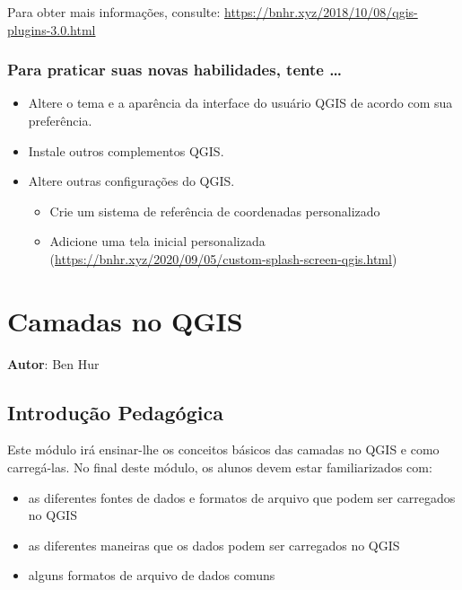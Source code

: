 \documentclass[
  portuguese,
]{krantz}
\providecommand{\tightlist}{%
  \setlength{\itemsep}{0pt}\setlength{\parskip}{0pt}}
\begin{document}
Para obter mais informações, consulte: \href{https://bnhr.xyz/2018/10/08/qgis-plugins-3.0.\%20html}{https://bnhr.xyz/2018/10/08/qgis-plugins-3.0.html}

\hypertarget{para-praticar-suas-novas-habilidades-tente}{%
\subsection{Para praticar suas novas habilidades, tente \ldots{}}\label{para-praticar-suas-novas-habilidades-tente}}

\begin{itemize}
\tightlist
\item
  Altere o tema e a aparência da interface do usuário QGIS de acordo com sua preferência.
\item
  Instale outros complementos QGIS.
\item
  Altere outras configurações do QGIS.

  \begin{itemize}
  \tightlist
  \item
    Crie um sistema de referência de coordenadas personalizado
  \item
    Adicione uma tela inicial personalizada (\href{https://bnhr.xyz/2020/09/05/custom-splash\%20-screen-qgis.html}{https://bnhr.xyz/2020/09/05/custom-splash-screen-qgis.html})
  \end{itemize}
\end{itemize}

\hypertarget{camadas-no-qgis}{%
\chapter{Camadas no QGIS}\label{camadas-no-qgis}}

\textbf{Autor}: Ben Hur

\hypertarget{introduuxe7uxe3o-pedaguxf3gica-2}{%
\section{Introdução Pedagógica}\label{introduuxe7uxe3o-pedaguxf3gica-2}}

Este módulo irá ensinar-lhe os conceitos básicos das camadas no QGIS e como carregá-las. No final deste módulo, os alunos devem estar familiarizados com:

\begin{itemize}
\tightlist
\item
  as diferentes fontes de dados e formatos de arquivo que podem ser carregados no QGIS
\item
  as diferentes maneiras que os dados podem ser carregados no QGIS
\item
  alguns formatos de arquivo de dados comuns
\end{itemize}
\end{document}

